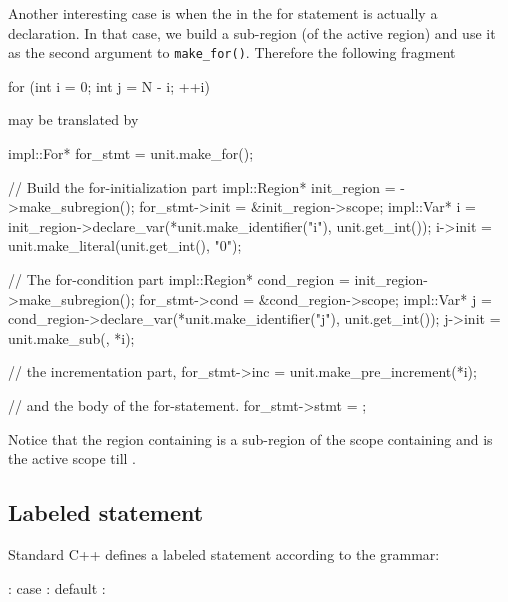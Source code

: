 \documentclass[11pt]{article}
\begin{document}
Another interesting case is when the  in the for statement
is actually a declaration.  In that case, we build a sub-region (of the active
region) and use it as the second argument to \texttt{make\_for()}. Therefore
the following fragment
\begin{Program}
  for (int i = 0; int j = N - i; ++i)
\end{Program}
may be translated by
\begin{Program}
  impl::For* for_stmt = unit.make_for();

  // Build the for-initialization part
  impl::Region* init_region = ->make_subregion();
  for_stmt->init = &init_region->scope;
  impl::Var* i = init_region->declare_var(*unit.make_identifier("i"),
                                          unit.get_int());
  i->init = unit.make_literal(unit.get_int(), "0");

  // The for-condition part
  impl::Region* cond_region = init_region->make_subregion();
  for_stmt->cond = &cond_region->scope;
  impl::Var* j = cond_region->declare_var(*unit.make_identifier("j"),
                                          unit.get_int());
  j->init = unit.make_sub(, *i);

  // the incrementation part,
  for_stmt->inc = unit.make_pre_increment(*i);

  // and the body of the for-statement.
  for_stmt->stmt = ;
\end{Program}
Notice that the region containing  is a sub-region of the scope
containing  and is the active scope till .


\subsection{Labeled statement}
\label{sec:stmt.labeled}

Standard C++ defines a labeled statement according to the grammar:
\begin{Grammar}
       : 
      case  : 
      default : 
\end{Grammar}
\end{document}
